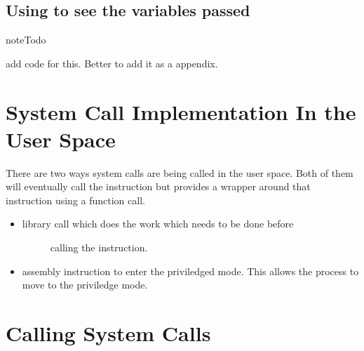 \documentclass[letterpaper,10pt,english]{sphinxmanual}
\begin{document}
\section{Using  to see the variables passed}
\label{\detokenize{06_setting_up_arguements:using-ptrace-to-see-the-variables-passed}}
\begin{sphinxadmonition}{note}{Todo}

add code for this. Better to add it as a appendix.
\end{sphinxadmonition}


\chapter{System Call Implementation In the User Space}
\label{\detokenize{06_system_call_implementation::doc}}\label{\detokenize{06_system_call_implementation:system-call-implementation-in-the-user-space}}
There are two ways system calls are being called in the user space. Both of
them will eventually call the  instruction but  provides a
wrapper around that instruction using a function call.
\begin{itemize}
\item {} \begin{description}
\item[{ library call which does the work which needs to be done before}] \leavevmode
calling the  instruction.

\end{description}

\item {} 
 assembly instruction to enter the priviledged mode. This allows
the process to move to the priviledge mode.

\end{itemize}


\chapter{Calling System Calls}
\label{\detokenize{07_calling_system_calls:calling-system-calls}}\label{\detokenize{07_calling_system_calls::doc}}
\end{document}
